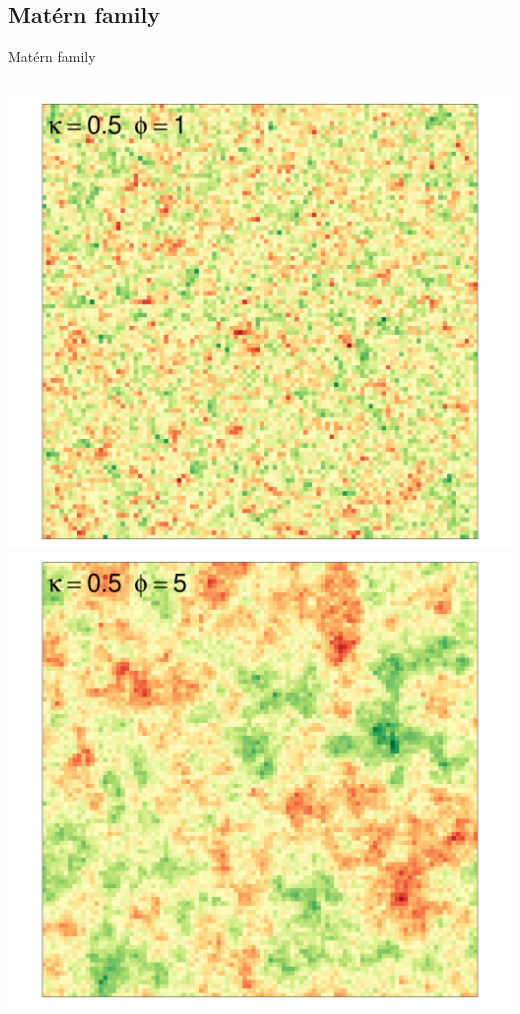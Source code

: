 \documentclass[
  ignorenonframetext,
]{beamer}
\begin{document}
\hypertarget{matuxe9rn-family-2}{%
\subsection{Matérn family}\label{matuxe9rn-family-2}}

\begin{frame}{Matérn family}
\small

\begin{columns}[T]
\begin{column}{0.33\textwidth}
\includegraphics{Lecture_1_files/figure-beamer/unnamed-chunk-26-1.pdf}
\includegraphics{Lecture_1_files/figure-beamer/unnamed-chunk-27-1.pdf}
\end{column}


\end{columns}
\end{frame}
\end{document}
